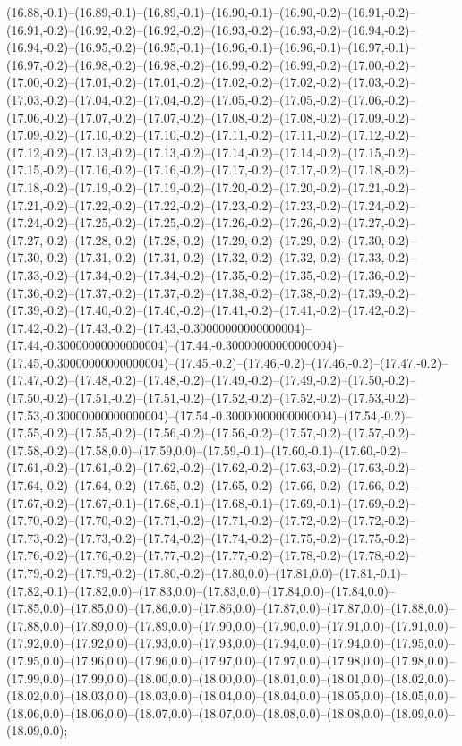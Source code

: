 (16.88,-0.1)--(16.89,-0.1)--(16.89,-0.1)--(16.90,-0.1)--(16.90,-0.2)--(16.91,-0.2)--(16.91,-0.2)--(16.92,-0.2)--(16.92,-0.2)--(16.93,-0.2)--(16.93,-0.2)--(16.94,-0.2)--(16.94,-0.2)--(16.95,-0.2)--(16.95,-0.1)--(16.96,-0.1)--(16.96,-0.1)--(16.97,-0.1)--(16.97,-0.2)--(16.98,-0.2)--(16.98,-0.2)--(16.99,-0.2)--(16.99,-0.2)--(17.00,-0.2)--(17.00,-0.2)--(17.01,-0.2)--(17.01,-0.2)--(17.02,-0.2)--(17.02,-0.2)--(17.03,-0.2)--(17.03,-0.2)--(17.04,-0.2)--(17.04,-0.2)--(17.05,-0.2)--(17.05,-0.2)--(17.06,-0.2)--(17.06,-0.2)--(17.07,-0.2)--(17.07,-0.2)--(17.08,-0.2)--(17.08,-0.2)--(17.09,-0.2)--(17.09,-0.2)--(17.10,-0.2)--(17.10,-0.2)--(17.11,-0.2)--(17.11,-0.2)--(17.12,-0.2)--(17.12,-0.2)--(17.13,-0.2)--(17.13,-0.2)--(17.14,-0.2)--(17.14,-0.2)--(17.15,-0.2)--(17.15,-0.2)--(17.16,-0.2)--(17.16,-0.2)--(17.17,-0.2)--(17.17,-0.2)--(17.18,-0.2)--(17.18,-0.2)--(17.19,-0.2)--(17.19,-0.2)--(17.20,-0.2)--(17.20,-0.2)--(17.21,-0.2)--(17.21,-0.2)--(17.22,-0.2)--(17.22,-0.2)--(17.23,-0.2)--(17.23,-0.2)--(17.24,-0.2)--(17.24,-0.2)--(17.25,-0.2)--(17.25,-0.2)--(17.26,-0.2)--(17.26,-0.2)--(17.27,-0.2)--(17.27,-0.2)--(17.28,-0.2)--(17.28,-0.2)--(17.29,-0.2)--(17.29,-0.2)--(17.30,-0.2)--(17.30,-0.2)--(17.31,-0.2)--(17.31,-0.2)--(17.32,-0.2)--(17.32,-0.2)--(17.33,-0.2)--(17.33,-0.2)--(17.34,-0.2)--(17.34,-0.2)--(17.35,-0.2)--(17.35,-0.2)--(17.36,-0.2)--(17.36,-0.2)--(17.37,-0.2)--(17.37,-0.2)--(17.38,-0.2)--(17.38,-0.2)--(17.39,-0.2)--(17.39,-0.2)--(17.40,-0.2)--(17.40,-0.2)--(17.41,-0.2)--(17.41,-0.2)--(17.42,-0.2)--(17.42,-0.2)--(17.43,-0.2)--(17.43,-0.30000000000000004)--(17.44,-0.30000000000000004)--(17.44,-0.30000000000000004)--(17.45,-0.30000000000000004)--(17.45,-0.2)--(17.46,-0.2)--(17.46,-0.2)--(17.47,-0.2)--(17.47,-0.2)--(17.48,-0.2)--(17.48,-0.2)--(17.49,-0.2)--(17.49,-0.2)--(17.50,-0.2)--(17.50,-0.2)--(17.51,-0.2)--(17.51,-0.2)--(17.52,-0.2)--(17.52,-0.2)--(17.53,-0.2)--(17.53,-0.30000000000000004)--(17.54,-0.30000000000000004)--(17.54,-0.2)--(17.55,-0.2)--(17.55,-0.2)--(17.56,-0.2)--(17.56,-0.2)--(17.57,-0.2)--(17.57,-0.2)--(17.58,-0.2)--(17.58,0.0)--(17.59,0.0)--(17.59,-0.1)--(17.60,-0.1)--(17.60,-0.2)--(17.61,-0.2)--(17.61,-0.2)--(17.62,-0.2)--(17.62,-0.2)--(17.63,-0.2)--(17.63,-0.2)--(17.64,-0.2)--(17.64,-0.2)--(17.65,-0.2)--(17.65,-0.2)--(17.66,-0.2)--(17.66,-0.2)--(17.67,-0.2)--(17.67,-0.1)--(17.68,-0.1)--(17.68,-0.1)--(17.69,-0.1)--(17.69,-0.2)--(17.70,-0.2)--(17.70,-0.2)--(17.71,-0.2)--(17.71,-0.2)--(17.72,-0.2)--(17.72,-0.2)--(17.73,-0.2)--(17.73,-0.2)--(17.74,-0.2)--(17.74,-0.2)--(17.75,-0.2)--(17.75,-0.2)--(17.76,-0.2)--(17.76,-0.2)--(17.77,-0.2)--(17.77,-0.2)--(17.78,-0.2)--(17.78,-0.2)--(17.79,-0.2)--(17.79,-0.2)--(17.80,-0.2)--(17.80,0.0)--(17.81,0.0)--(17.81,-0.1)--(17.82,-0.1)--(17.82,0.0)--(17.83,0.0)--(17.83,0.0)--(17.84,0.0)--(17.84,0.0)--(17.85,0.0)--(17.85,0.0)--(17.86,0.0)--(17.86,0.0)--(17.87,0.0)--(17.87,0.0)--(17.88,0.0)--(17.88,0.0)--(17.89,0.0)--(17.89,0.0)--(17.90,0.0)--(17.90,0.0)--(17.91,0.0)--(17.91,0.0)--(17.92,0.0)--(17.92,0.0)--(17.93,0.0)--(17.93,0.0)--(17.94,0.0)--(17.94,0.0)--(17.95,0.0)--(17.95,0.0)--(17.96,0.0)--(17.96,0.0)--(17.97,0.0)--(17.97,0.0)--(17.98,0.0)--(17.98,0.0)--(17.99,0.0)--(17.99,0.0)--(18.00,0.0)--(18.00,0.0)--(18.01,0.0)--(18.01,0.0)--(18.02,0.0)--(18.02,0.0)--(18.03,0.0)--(18.03,0.0)--(18.04,0.0)--(18.04,0.0)--(18.05,0.0)--(18.05,0.0)--(18.06,0.0)--(18.06,0.0)--(18.07,0.0)--(18.07,0.0)--(18.08,0.0)--(18.08,0.0)--(18.09,0.0)--(18.09,0.0);